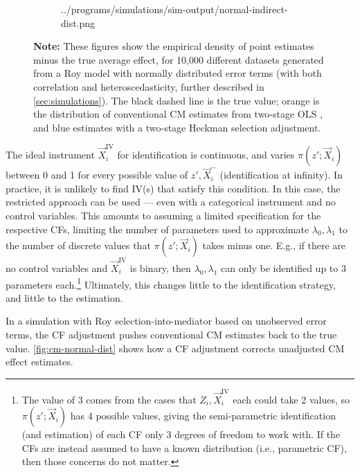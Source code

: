 \begin{figure}[!h]
\begin{subfigure}[c]{0.475\textwidth}
{            ../programs/simulations/sim-output/normal-indirect-dist.png}
    \end{subfigure}
    \label{fig:cm-normal-dist}
    \justify
    \footnotesize
    \textbf{Note:}
    These figures show the empirical density of point estimates minus the true average effect, for 10,000 different datasets generated from a Roy model with normally distributed error terms (with both correlation and heteroscedasticity, further described in \autoref{sec:simulations}).
    The black dashed line is the true value;
    orange is the distribution of conventional CM estimates from two-stage OLS \citep{imai2010identification},
    and blue estimates with a two-stage Heckman selection adjustment.
\end{figure}

The ideal instrument $\vec X_i^{\text{IV}}$ for identification is continuous, and varies $\pi(z'; \vec X_i)$ between 0 and 1 for every possible value of $z', \vec X_i^-$ (identification at infinity).
In practice, it is unlikely to find IV(s) that satisfy this condition.
In this case, the \cite{brinch2017beyond} restricted approach can be used --- even with a categorical instrument and no control variables.
This amounts to assuming a limited specification for the respective CFs, limiting the number of parameters used to approximate $\lambda_0, \lambda_1$ to the number of discrete values that $\pi(z'; \vec X_i)$ takes minus one.
E.g., if there are no control variables and $\vec X_i^{\text{IV}}$ is binary, then $\lambda_0, \lambda_1$ can only be identified up to 3 parameters each.\footnote{
    The value of 3 comes from the cases that $Z_i, \vec X_i^{\text{IV}}$ each could take 2 values, so $\pi(z'; \vec X_i)$ has 4 possible values, giving the semi-parametric identification (and estimation) of each CF only 3 degrees of freedom to work with.
    If the CFs are instead assumed to have a known distribution (i.e., parametric CF), then those concerns do not matter.
}
Ultimately, this changes little to the identification strategy, and little to the estimation.

In a simulation with Roy selection-into-mediator based on unobserved error terms, the CF adjustment pushes conventional CM estimates back to the true value. 
\autoref{fig:cm-normal-dist} shows how a CF adjustment corrects unadjusted CM effect estimates.
